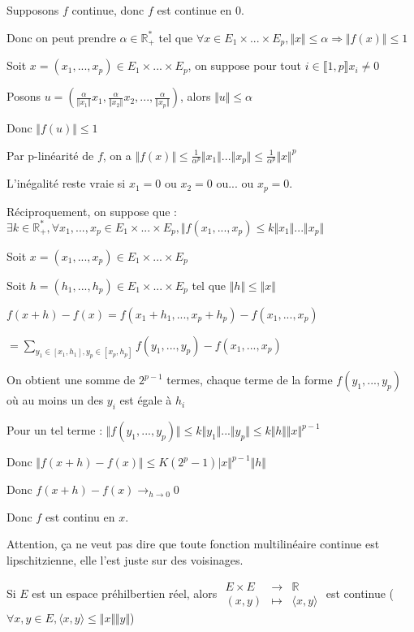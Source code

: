 \documentclass[a4paper,12pt]{book}
\newcommand{\Prop}[2]{\begin{tcolorbox}[sharp corners, colback=white,colframe=red!90!black!75, title=Proposition : #1]#2\end{tcolorbox}}
\newcommand{\Pre}[1]{\begin{tcolorbox}[sharp corners, colback=white,colframe=green!60!green!30!black!75, title=Preuve]#1\end{tcolorbox}}
\def\R{\mathbb{R}}
\begin{document}
\Pre{Supposons $f$ continue, donc $f$ est continue en $0$. \par Donc on peut prendre $\alpha\in\R_+^*$ tel que $\forall x\in E_1\times...\times E_p, \Vert x\Vert \leq\alpha\Rightarrow \Vert f(x)\Vert \leq 1$ \par Soit $x=(x_1,..., x_p)\in E_1\times...\times E_p$, on suppose pour tout $i\in\llbracket 1,p\rrbracket x_i\neq 0$ \par Posons $u=(\frac{\alpha}{\Vert x_1\Vert}x_1,\frac{\alpha}{\Vert x_2\Vert}x_2,..., \frac{\alpha}{\Vert x_p\Vert})$, alors $\Vert u\Vert\leq \alpha$
\par Donc $\Vert f(u)\Vert\leq 1$ \par Par p-linéarité de $f$, on a $\Vert f(x)\Vert \leq \frac{1}{\alpha^p}\Vert x_1\Vert...\Vert x_p\Vert\leq \frac{1}{\alpha^p}\Vert x\Vert^p$ \par L'inégalité reste vraie si $x_1=0$ ou $x_2=0$ ou... ou $x_p=0$.
\par Réciproquement, on suppose que : $\exists k\in\R_+^*, \forall x_1,..., x_p\in E_1\times...\times E_p, \Vert f(x_1,..., x_p)\leq k\Vert x_1\Vert...\Vert x_p\Vert$ \par Soit $x=(x_1,...,x_p)\in E_1\times...\times E_p$ \par Soit $h=(h_1,...,h_p)\in E_1\times...\times E_p$ tel que $\Vert h\Vert\leq\Vert x\Vert$ \par $f(x+h)-f(x) =f(x_1+h_1,..., x_p+h_p)-f(x_1,...,x_p)$ \par $=\sum\limits_{y_1\in [x_1,h_1], y_p\in [x_p, h_p]} f(y_1,...,y_p)-f(x_1,...,x_p)$ \par On obtient une somme de $2^{p-1}$ termes, chaque terme de la forme $f(y_1,..., y_p)$ où au moins un des $y_i$ est égale à $h_i$
\par Pour un tel terme : $\Vert f(y_1,..., y_p)\Vert\leq k\Vert y_1\Vert...\Vert y_p\Vert\leq k\Vert h\Vert \Vert x\Vert^{p-1}$ \par Donc $\Vert f(x+h)-f(x)\Vert\leq K(2^p-1)\vert x\Vert^{p-1}\Vert h\Vert$ \par Donc $f(x+h)-f(x)\to_{h\to 0} 0$ \par Donc $f$ est continu en $x$.} 
Attention, ça ne veut pas dire que toute fonction multilinéaire continue est lipschitzienne, elle l'est juste sur des voisinages.
\Prop{Application}{Si $E$ est un espace préhilbertien réel, alors $\begin{array}{rcl} E\times E & \to & \R \\ (x,y) & \mapsto & \langle x,y \rangle\end{array}$ est continue ($\forall x,y\in E, \langle x,y\rangle \leq \Vert x\Vert\Vert y\Vert$)}
\end{document}
